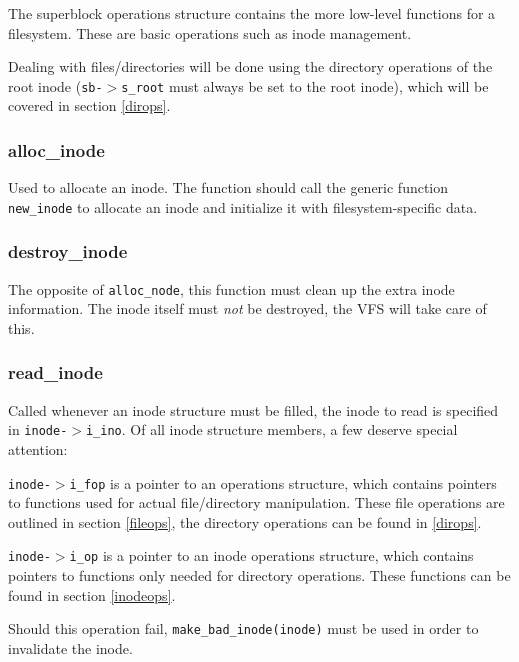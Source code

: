 The superblock operations structure contains the more low-level functions for a filesystem. These are basic operations such as inode management.

Dealing with files/directories will be done using the directory operations of the root inode (\texttt{sb-$>$s\_root} must always be set to the root inode), which will be covered in section \ref{dirops}.

\subsubsection{alloc\_inode}


Used to allocate an inode. The function should call the generic function \texttt{new\_inode} to allocate an inode and initialize it with filesystem-specific data.

\subsubsection{destroy\_inode}


The opposite of \texttt{alloc\_node}, this function must clean up the extra inode information. The inode itself must \emph{not} be destroyed, the VFS will take care of this.

\subsubsection{read\_inode}


Called whenever an inode structure must be filled, the inode to read is specified in \texttt{inode-$>$i\_ino}. Of all inode structure members, a few deserve special attention:

\texttt{inode-$>$i\_fop} is a pointer to an operations structure, which contains pointers to functions used for actual file/directory manipulation. These file operations are outlined in section \ref{fileops}, the directory operations can be found in \ref{dirops}.

\texttt{inode-$>$i\_op} is a pointer to an inode operations structure, which contains pointers to functions only needed for directory operations. These functions can be found in section \ref{inodeops}.

Should this operation fail, \texttt{make\_bad\_inode(inode)} must be used in order to invalidate the inode.

